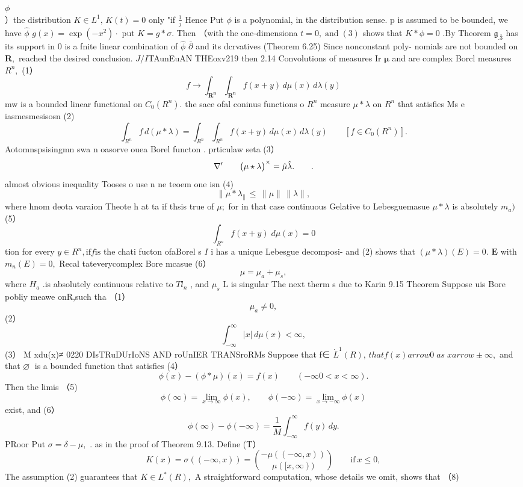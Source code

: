 $\phi~~~~~~~~~~~~~~~~~~~~~~~~~~~~~~~~~~~~~~~~~~~~~~~~~~~~~~~~~~~~~~~~~~~~~~~~~~~~~~~~~~~~~~~~~~~~~~~~~~~~~~~~~~~~~~~~~~~~~~~~~~~~~~~~~~~~~~~~~~~~~~~~~~~~~~~~~~~~~~~~~~~~~~~~~~~~~~~~~~~~~~~~~~~~~~~~~~~~~~~~~~~~~~~~~~~~~~~~~~~~~~~~~~~~~~~~~~~~~~~~~~~~~~~~~~~~~~~~~~~~~~~~~~~~~~~~~~~~~~~~~~~~$ ）the distribution $K\in L^{1},\,K(t)=0$ only "if $\frac{1}{j}$ Hence Put $\phi$ is a polynomial, in the distribution sense. p is assumed to be bounded, we have $\hat{\phi}$ $g(x)=\exp\left(-x^{2}\right)\!\cdot\!$ put $K=g*\sigma.$ Then （with the one-dimensiona $t=0,\;{\mathrm{and}}\;(3)$ shows that $K*\phi=0$ .By Theorem ${\mathfrak{g}}_{.{\bar{3}}}$ has its support in {0} is a fnite linear combination of $\hat{\phi}$ $\bar{\partial}$ and its dcrvatives (Theorem 6.25) Since nonconstant poly- nomials are not bounded on ${\boldsymbol{R}},$ reached the desired conclusion. $J/I$TAunEuAN THEoxv219 then 2.14 Convolutions of measures Ir $\boldsymbol{\mu}$ and are complex Borcl measures $\textstyle{R^{n}},$ (1） $$ f\to\int_{\boldsymbol{R^{n}}}\int_{\boldsymbol{R^{n}}}f(x+y)\,d\mu(x)\,d\lambda(y) $$ mw is a bounded linear functional on $C_{0}(R^{n}).$ the sace ofal coninus functions o $R^{n}$ measure $\mu*{\scriptstyle\lambda}$ on ${\textstyle R}^{n}$ that satisfies Ms e iasmesmesisosn (2) $$ \int_{R^{n}}f\,d(\mu*\lambda)=\int_{R^{n}}\int_{R^{n}}f(x+y)\,d\mu(x)\,d\lambda(y)\qquad[f\in C_{0}(R^{n})]. $$ Aotomnspsisingmn swa n oasorve ouea Borel functon . prticulaw seta (3） $$ {\bf\nabla}^{\prime}\qquad\bigl(\mu\star\lambda\bigr)^{\times}=\hat{\mu}\hat{\lambda}.\qquad. $$ almost obvious inequality Tooses o use n ne teoem one isn (4) $$ \|\mu*\lambda_{\|}\,\leq\,\|\mu\|\,\|\lambda\|, $$ where hnom deota varaion Theote h at ta if thsis true of $\mu;$ for in that case continuous Gelative to Lebesguemasue $\mu*\lambda$ is absolutely $m_{a})$ (5） $$ \int_{R^{n}}f(x+y)\;d\mu(x)=0 $$ tion for every $y\in R^{n},{\mathrm{if}}f{\mathrm{is}}$ the chati fucton ofaBorel s $\boldsymbol{\mathit{I}}$ i has a unique Lebesgue decomposi- and (2) shows that $(\mu*\lambda)(E)=0.$ $\boldsymbol{E}$ with $m_{n}(E)=0,$ Recal tateverycomplex Bore mcasue (6） $$ \mu=\mu_{a}+\mu_{s}, $$ where $\textstyle H_{a}$ .is absolutely continuous rclative to $T l_{n}$ , and $\textstyle\mu_{s}$ L is singular The next therm s due to Karin 9.15 Theorem Suppose uis Bore pobliy meawe onR,such tha （1） $$ \mu_{a}\neq0, $$ (2） $$ \textstyle{\int_{-\infty}^{\infty}|x|\,d\mu(x)<\infty,} $$ (3） M xdu(x)≠ 0220 DIsTRuDUrIoNS AND roUnIER TRANSroRMs Suppose that f∈ $\dot{L}^{1}(R),\,t h a t{f(x)} arrow0\;a s\;x arrow\pm\infty,$ and that $\varnothing\;$ is a bounded function that satisfies (4） $$ \phi(x)-(\phi*\mu)(x)=f(x)\qquad(-\infty0<x<\infty). $$ Then the limis （5) $$ \phi(\infty)=\operatorname*{lim}_{x\to\infty}\phi(x),\qquad\phi(-\infty)=\operatorname*{lim}_{x\to-\infty}\phi(x) $$ exist, and (6） $$ \phi(\infty)-\phi(-\infty)={\frac{1}{M}}\int_{-\infty}^{\infty}\!f(y)\,d y. $$ PRoor Put $\sigma=\delta-\mu,$ . as in the proof of Theorem 9.13. Define (T） $$ K(x)=\sigma((-\infty,x))={\binom{-\mu((-\infty,x))}{\mu([x,\infty))}}\qquad{\mathrm{if~}}x\leq0, $$ The assumption (2) guarantees that $K\in L^{*}(R),$ A straightforward computation, whose details we omit, shows that （8) $$ 